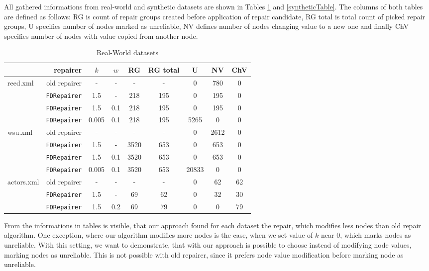 All gathered informations from real-world and synthetic datasets are shown in Tables \ref{realWorldTable} and \ref{syntheticTable}. The columns of both tables are defined as follows: RG is count of repair groups created before application of repair candidate, RG total is total count of picked repair groups, U specifies number of nodes marked as unreliable, NV defines number of nodes changing value to a new one and finally ChV specifies number of nodes with value copied from another node.\\


\begin{table}
    \begin{tabular}{| l | r | *{7}{c|}}
    \hline
    & repairer & $k$ & $w$ & RG & RG total & U & NV & ChV\\ \hline
    \multirow{4}{*}{reed.xml} & old repairer & - & - & - & - & 0 & 780 & 0\\
    & \texttt{FDRepairer} & 1.5 & - & 218 & 195 & 0 & 195 & 0\\
    & \texttt{FDRepairer} & 1.5 & 0.1 & 218 & 195 & 0 & 195 & 0\\
    & \texttt{FDRepairer} & 0.005 & 0.1 & 218 & 195 & 5265 & 0 & 0\\ \hline
    \multirow{4}{*}{wsu.xml} & old repairer & - & - & - & - & 0 & 2612 & 0\\
    & \texttt{FDRepairer} & 1.5 & - & 3520 & 653 & 0 & 653 & 0\\
    & \texttt{FDRepairer} & 1.5 & 0.1 & 3520 & 653 & 0 & 653 & 0\\
    & \texttt{FDRepairer} & 0.005 & 0.1 & 3520 & 653 & 20833 & 0 & 0\\ \hline
    \multirow{3}{*}{actors.xml} & old repairer & - & - & - & - & 0 & 62 & 62\\
    & \texttt{FDRepairer} & 1.5 & - & 69 & 62 & 0 & 32 & 30\\
    & \texttt{FDRepairer} & 1.5 & 0.2 & 69 & 79 & 0 & 0 & 79\\ \hline
    \end{tabular}
\caption{Real-World datasets}
\label{realWorldTable}
\end{table}

From the informations in tables is visible, that our approach found for each dataset the repair, which modifies less nodes than old repair algorithm. One exception, where our algorithm modifies more nodes is the case, when we set value of $k$ near 0, which marks nodes as unreliable. With this setting, we want to demonstrate, that with our approach is possible to choose instead of modifying node values, marking nodes as unreliable. This is not possible with old repairer, since it prefers node value modification before marking node as unreliable.

